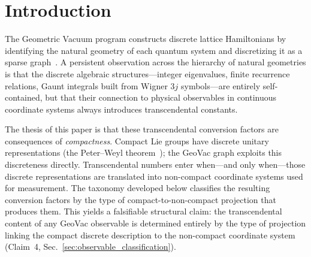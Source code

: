 \documentclass[aps,pra,twocolumn,superscriptaddress,longbibliography]{revtex4-2}
\begin{document}
\begin{abstract}
A complementary \textbf{Observation (structural incommensurability)}
catalogues the meta-pattern: GeoVac observables that look unitary
at the surface ($K$ itself; two-loop QED on~$S^3$; zero structure
of the GeoVac zeta) resolve under structural analysis into objects
from different cells of the three-axis grid.  No further unification
is currently visible.  The taxonomy is identified as a classification
of Mellin transforms of heat kernels: the free heat kernel produces
$\pi^{\mathrm{even}}$, the interaction-deformed kernel produces
$L$-content via vertex parity, and operator order determines whether
the Mellin integrand samples squared or raw eigenvalues.
The classification is $R$-independent, persisting in the flat-space
limit via Weyl's law.
\end{abstract}

\maketitle


\section{Introduction}
\label{sec:intro}

The Geometric Vacuum program constructs discrete lattice
Hamiltonians by identifying the natural geometry of each quantum
system and discretizing it as a sparse
graph~\cite{loutey_paper0,loutey_paper1,loutey_paper7}.  A
persistent observation across the hierarchy of natural geometries
is that the discrete algebraic structures---integer eigenvalues,
finite recurrence relations, Gaunt integrals built from Wigner
$3j$ symbols---are entirely self-contained, but that their
connection to physical observables in continuous coordinate
systems always introduces transcendental constants.

The thesis of this paper is that these transcendental conversion
factors are consequences of \emph{compactness}.  Compact Lie groups
have discrete unitary representations (the Peter--Weyl
theorem~\cite{peter_weyl1927}); the GeoVac graph exploits this
discreteness directly.  Transcendental numbers enter when---and only
when---those discrete representations are translated into non-compact
coordinate systems used for measurement.  The taxonomy developed below
classifies the resulting conversion factors by the type of
compact-to-non-compact projection that produces them.  This yields a
falsifiable structural claim: the transcendental content of any GeoVac
observable is determined entirely by the type of projection linking
the compact discrete description to the non-compact coordinate system
(Claim~4, Sec.~\ref{sec:observable_classification}).
\end{document}
